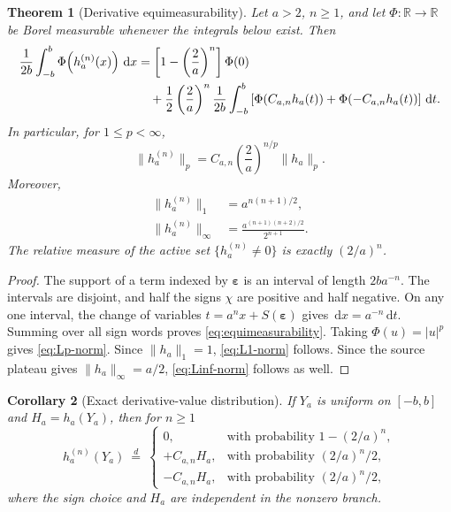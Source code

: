 \documentclass[11pt,oneside]{article}
\newtheorem{theorem}{Theorem}[section]
\newtheorem{corollary}[theorem]{Corollary}
\theoremstyle{definition}
\theoremstyle{remark}
\newcommand{\R}{\mathbb{R}}
\newcommand{\dd}{\,\mathrm{d}}
\begin{document}
\begin{theorem}[Derivative equimeasurability]
\label{thm:equimeasurability}
Let \(a>2\), \(n\ge1\), and let \(\Phi:\R\to\R\) be Borel measurable whenever the integrals below exist.  Then
\begin{align}
 \frac1{2b}\int_{-b}^{b}\Phi\!\left(h_a^{(n)}(x)\right)\dd x
 &=\left[1-\left(\frac2a\right)^n\right]\Phi(0)
 \notag\\
 &\quad+\frac12\left(\frac2a\right)^n
  \frac1{2b}\int_{-b}^{b}
   \left[\Phi(C_{a,n}h_a(t))+\Phi(-C_{a,n}h_a(t))\right]\dd t.
 \label{eq:equimeasurability}
\end{align}
In particular, for \(1\le p<\infty\),
\begin{equation}
  \boxed{\quad
  \|h_a^{(n)}\|_p=C_{a,n}\left(\frac2a\right)^{n/p}\|h_a\|_p.
  \quad}
  \label{eq:Lp-norm}
\end{equation}
Moreover,
\begin{align}
  \|h_a^{(n)}\|_1&=a^{n(n+1)/2},
  \label{eq:L1-norm}\\
  \|h_a^{(n)}\|_\infty
  &=\frac{a^{(n+1)(n+2)/2}}{2^{n+1}}.
  \label{eq:Linf-norm}
\end{align}
The relative measure of the active set \(\{h_a^{(n)}\ne0\}\) is exactly \((2/a)^n\).
\end{theorem}

\begin{proof}
The support of a term indexed by \(\boldsymbol\varepsilon\) is an interval of length \(2ba^{-n}\).  The intervals are disjoint, and half the signs \(\chi\) are positive and half negative.  On any one interval, the change of variables
\(t=a^nx+S(\boldsymbol\varepsilon)\) gives \(\dd x=a^{-n}\dd t\).  Summing over all sign words proves \eqref{eq:equimeasurability}.  Taking \(\Phi(u)=|u|^p\) gives \eqref{eq:Lp-norm}.  Since \(\|h_a\|_1=1\), \eqref{eq:L1-norm} follows.  Since the source plateau gives \(\|h_a\|_\infty=a/2\), \eqref{eq:Linf-norm} follows as well.
\end{proof}

\begin{corollary}[Exact derivative-value distribution]
If \(Y_a\) is uniform on \([-b,b]\) and \(H_a=h_a(Y_a)\), then for \(n\ge1\)
\begin{equation}
 h_a^{(n)}(Y_a)\ \overset d=\
 \begin{cases}
  0, &\text{with probability }1-(2/a)^n,\\
  +C_{a,n}H_a, &\text{with probability }(2/a)^n/2,\\
  -C_{a,n}H_a, &\text{with probability }(2/a)^n/2,
 \end{cases}
 \label{eq:derivative-mixture-law}
\end{equation}
where the sign choice and \(H_a\) are independent in the nonzero branch.
\end{corollary}
\end{document}
